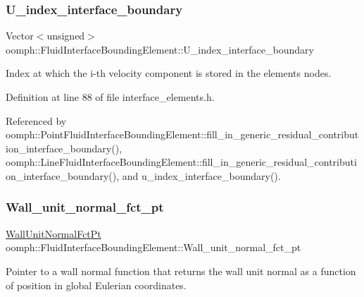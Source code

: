 \subsubsection{\texorpdfstring{U\+\_\+index\+\_\+interface\+\_\+boundary}{U\_index\_interface\_boundary}}
{\footnotesize\ttfamily Vector$<$unsigned$>$ oomph\+::\+Fluid\+Interface\+Bounding\+Element\+::\+U\+\_\+index\+\_\+interface\+\_\+boundary\hspace{0.3cm}{\ttfamily [protected]}}



Index at which the i-\/th velocity component is stored in the element\textquotesingle{}s nodes. 



Definition at line 88 of file interface\+\_\+elements.\+h.



Referenced by oomph\+::\+Point\+Fluid\+Interface\+Bounding\+Element\+::fill\+\_\+in\+\_\+generic\+\_\+residual\+\_\+contribution\+\_\+interface\+\_\+boundary(), oomph\+::\+Line\+Fluid\+Interface\+Bounding\+Element\+::fill\+\_\+in\+\_\+generic\+\_\+residual\+\_\+contribution\+\_\+interface\+\_\+boundary(), and u\+\_\+index\+\_\+interface\+\_\+boundary().

\mbox{\label{classoomph_1_1FluidInterfaceBoundingElement_abc765a3b2c4eac762a1a5ba85ac4a7a4}} 
\subsubsection{\texorpdfstring{Wall\+\_\+unit\+\_\+normal\+\_\+fct\+\_\+pt}{Wall\_unit\_normal\_fct\_pt}}
{\footnotesize\ttfamily \hyperlink{classoomph_1_1FluidInterfaceBoundingElement_a09c0b1df7d653eaf55e94e3951d409dd}{Wall\+Unit\+Normal\+Fct\+Pt} oomph\+::\+Fluid\+Interface\+Bounding\+Element\+::\+Wall\+\_\+unit\+\_\+normal\+\_\+fct\+\_\+pt\hspace{0.3cm}{\ttfamily [private]}}



Pointer to a wall normal function that returns the wall unit normal as a function of position in global Eulerian coordinates. 



